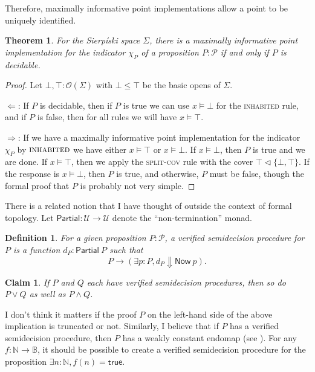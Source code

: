 \documentclass{article}           %
\newtheorem{definition}{Definition}
\newtheorem{theorem}{Theorem}
\newtheorem{claim}{Claim}
\newcommand{\cov}{\vartriangleleft}
\newcommand{\Type}{\mathcal{U}}
\newcommand{\Prop}{\mathcal{P}}
\newcommand{\nat}{\mathbb{N}}
\newcommand{\Open}[1]{\mathcal{O}({#1})}
\newcommand{\bool}{\mathbb{B}}
\newcommand{\irule}[1]{\textsc{#1}}
\begin{document}
Therefore, maximally informative point implementations allow a point to be uniquely identified.
\begin{theorem}
For the Sierpíski space $\Sigma$, there is a maximally informative point implementation for the indicator $\chi_P$ of a proposition $P : \Prop$ if and only if $P$ is decidable.
\end{theorem}
\begin{proof}
Let $\bot, \top : \Open{\Sigma}$ with $\bot \le \top$ be the basic opens of $\Sigma$. 

$\Longleftarrow$: If $P$ is decidable, then if $P$ is true we can use $x \models \bot$ for the \irule{inhabited} rule, and if $P$ is false, then for all rules we will have $x \models \top$.

$\Longrightarrow$: If we have a maximally informative point implementation for the indicator $\chi_P$ by $\irule{inhabited}$ we have either $x \models \top$ or $x \models \bot$. If $x \models \bot$, then $P$ is true and we are done. If $x \models \top$, then we apply the \irule{split-cov} rule with the cover $\top \cov \{ \bot, \top \}$. If the response is $x \models \bot$, then $P$ is true, and otherwise, $P$ must be false, though the formal proof that $P$ is probably not very simple.
\end{proof}

There is a related notion that I have thought of outside the context of formal topology. Let $\mathsf{Partial} : \Type \to \Type$ denote the ``non-termination'' monad. 
\begin{definition}
For a given proposition $P : \Prop$, a \emph{verified semidecision procedure} for $P$ is a function $d_P : \mathsf{Partial}\ P$ such that
\[
P \to (\exists p : P, d_P \Downarrow \mathsf{Now}\ p).
\]
\end{definition}

\begin{claim}
If $P$ and $Q$ each have verified semidecision procedures, then so do $P \vee Q$ as well as $P \wedge Q$.
\end{claim}

I don't think it matters if the proof $P$ on the left-hand side of the above implication is truncated or not. Similarly, I believe that if $P$ has a verified semidecision procedure, then $P$ has a weakly constant endomap (see \cite{kraus2014}). For any $f : \nat \to \bool$, it should be possible to create a verified semidecision procedure for the proposition $\exists n : \nat, f(n) = \mathsf{true}$.
\end{document}
